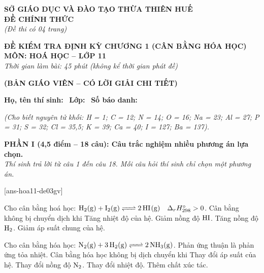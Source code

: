 \documentclass[12pt,a4paper]{article}
\begin{document}
\thispagestyle{firstpage}

\noindent
\begin{minipage}[t]{0.44\textwidth}
	\centering\fontsize{10pt}{12pt}\selectfont
	\textbf{SỞ GIÁO DỤC VÀ ĐÀO TẠO THỪA THIÊN HUẾ}\\
	\textbf{ĐỀ CHÍNH THỨC}\\
	\textit{(Đề thi có 04 trang)}
\end{minipage}\hfill
\begin{minipage}[t]{0.54\textwidth}
	\centering\small
	\textbf{ĐỀ KIỂM TRA ĐỊNH KỲ CHƯƠNG 1 (CÂN BẰNG HÓA HỌC)}\\
	\textbf{MÔN: HOÁ HỌC -- LỚP 11}\\
	\textit{Thời gian làm bài: 45 phút (không kể thời gian phát đề)}\\
\end{minipage}

\smallskip
\begin{center}
	{\color{hfRed}\textbf{\large (BẢN GIÁO VIÊN -- CÓ LỜI GIẢI CHI TIẾT)}}
\end{center}

\smallskip
\noindent\hrulefill
\smallskip

\noindent\textbf{Họ, tên thí sinh:} \dotfill\ \textbf{Lớp:} \dotfill\ \textbf{Số báo danh:} \dotfill

\smallskip
\noindent\textit{(Cho biết nguyên tử khối: H = 1; C = 12; N = 14; O = 16; Na = 23; Al = 27; P = 31; S = 32; Cl = 35,5; K = 39; Ca = 40; I = 127; Ba = 137).}
\smallskip

\noindent
\textbf{PHẦN I (4,5 điểm -- 18 câu): Câu trắc nghiệm nhiều phương án lựa chọn.}\\
\textit{Thí sinh trả lời từ câu 1 đến câu 18. Mỗi câu hỏi thí sinh chỉ chọn một phương án.}

[ans-hoa11-de03gv]

\begin{ex}
Cho cân bằng hoá học: $\ce{H2(g) + I2(g) <=> 2HI(g)} \quad \Delta_r H^\circ_{298} > 0$. Cân bằng không bị chuyển dịch khi
\choice
{Tăng nhiệt độ của hệ.}
{Giảm nồng độ $\ce{HI}$.}
{Tăng nồng độ $\ce{H2}$.}
{\True Giảm áp suất chung của hệ.}
\end{ex}

\begin{ex}
Cho cân bằng hóa học: $\ce{N2(g) + 3H2(g) <=> 2NH3(g)}$. Phản ứng thuận là phản ứng tỏa nhiệt. Cân bằng hóa học không bị dịch chuyển khi
\choice
{Thay đổi áp suất của hệ.}
{Thay đổi nồng độ $\ce{N2}$.}
{Thay đổi nhiệt độ.}
{\True Thêm chất xúc tác.}
\end{ex}
\end{document}
